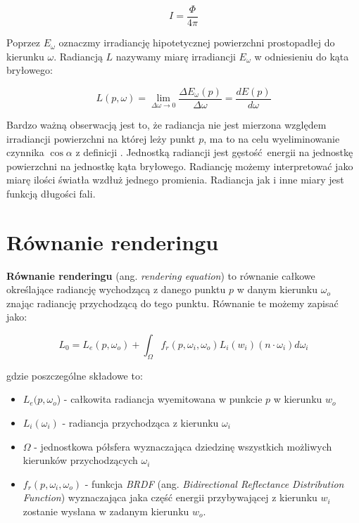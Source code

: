 \documentclass[../main.tex]{subfiles}
\begin{document}
\[
  I = \frac{\Phi}{4\pi}
\]

Poprzez $E_{\omega}$ oznaczmy irradiancję hipotetycznej powierzchni
prostopadłej do kierunku $\omega$. Radiancją $L$ nazywamy miarę irradiancji
$E_{\omega}$ w odniesieniu do kąta bryłowego:

$$
L(p, \omega) = \lim_{\Delta\omega \rightarrow 0} {
  \frac{\Delta E_{\omega} (p)}{\Delta\omega}
} =
\frac{d E(p)}{d \omega}
$$

Bardzo ważną obserwacją jest to, że radiancja nie jest mierzona względem
irradiancji powierzchni na której leży punkt $p$, ma to na celu wyeliminowanie
czynnika $\cos \alpha$ z definicji \cite[p. 339]{pbrt}. Jednostką radiancji
jest gęstość energii na jednostkę powierzchni na jednostkę kąta bryłowego.
Radiancję możemy interpretować jako miarę ilości światła wzdłuż jednego
promienia. Radiancja jak i inne miary jest funkcją długości fali.

\section{Równanie renderingu}

\textbf{Równanie renderingu} (ang. \textit{rendering equation}) to równanie
całkowe określające radiancję wychodzącą z danego punktu $p$ w danym kierunku
$\omega_o$ znając radiancję przychodzącą do tego punktu. Równanie te możemy
zapisać jako:

\[
  L_0 =
  L_{e}(p, \omega_o) +
  \int_{\Omega} {
    f_r(p, \omega_i, \omega_o)
    L_i(w_i)
    (n \cdot \omega_i)
    d \omega_i
  }
\]

\noindent gdzie poszczególne składowe to:

\begin{itemize}

  \item $L_e(p, \omega_o$) - całkowita radiancja wyemitowana  w punkcie $p$ w
    kierunku $w_o$

  \item $L_i(\omega_i)$ - radiancja przychodząca z kierunku $\omega_i$

  \item $\Omega$ - jednostkowa półsfera wyznaczająca dziedzinę wszystkich
    możliwych kierunków przychodzących $\omega_i$

  \item $f_{r}(p, \omega_i, \omega_o)$ - funkcja \textit{BRDF} (ang.
    \textit{Bidirectional Reflectance Distribution Function}) wyznaczająca jaka
    część energii przybywającej z kierunku $w_i$ zostanie wysłana w zadanym
    kierunku $w_o$.

\end{itemize}
\end{document}
